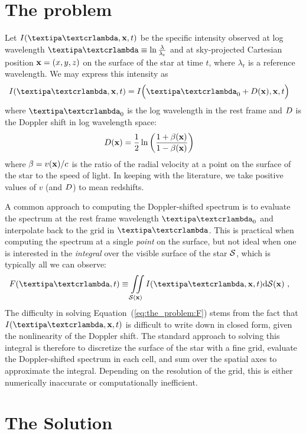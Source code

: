 \documentclass[modern]{aastex631}
\begin{document}
\section{The problem}
\label{sec:the_problem}
%
Let $I(\lnlam, \x, t)$ be the specific intensity observed at log wavelength $\lnlam \equiv \ln\frac{\lambda}{\lambda_\mathrm{r}}$ and at sky-projected Cartesian position ${\mathbf{x}} = (x, y, z)$ on the surface of the star at time $t$, where $\lambda_\mathrm{r}$ is a reference wavelength.
We may express this intensity as
%
\begin{align}
    \label{eq:the_problem:Ixi}
    I(\lnlam, \x, t) & =
    I\Big(\lnlam_0 + \D(\x), \x, t\Big)
\end{align}
%
where $\lnlam_0$ is the log wavelength in the rest frame and $D$ is the Doppler shift in log wavelength space:
%
\begin{align}
    \label{eq:the_problem:D}
    D({\mathbf{x}})
     & =
    \frac{1}{2}\ln\left(
    \frac{1 + \beta({\mathbf{x}})}{1 - \beta({\mathbf{x}})}
    \right)
\end{align}
%
where $\beta = v({\mathbf{x}}) / c$ is the ratio of the radial velocity at a point on the surface of the star to the speed of light.
In keeping with the literature, we take positive values of $v$ (and $D$) to mean redshifts.

A common approach to computing the Doppler-shifted spectrum is to evaluate the spectrum at the rest frame wavelength $\lnlam_0$ and interpolate back to the grid in $\lnlam$. 
This is practical when computing the spectrum at a single \emph{point} on the surface, but not ideal when one is interested in the \emph{integral} over the visible surface of the star $\mathcal{S}$, which is typically all we can observe:
%
\begin{align}
    \label{eq:the_problem:F}
    F(\lnlam, t)
     & \equiv
    \iint\limits_{\Surf(\x)}
    I(\lnlam, \x, t)
    \mathrm{d}{\Surf(\x)}
    \quad,
\end{align}
%
The difficulty in solving Equation~(\ref{eq:the_problem:F}) stems from the fact that $I(\lnlam, \x, t)$ is difficult to write down in closed form, given the nonlinearity of the Doppler shift.
The standard approach to solving this integral is therefore to discretize the surface of the star with a fine grid, evaluate the Doppler-shifted spectrum in each cell, and sum over the spatial axes to approximate the integral. 
Depending on the resolution of the grid, this is either numerically inaccurate or computationally inefficient.

\section{The Solution}
\label{sec:the_solution}
\end{document}
